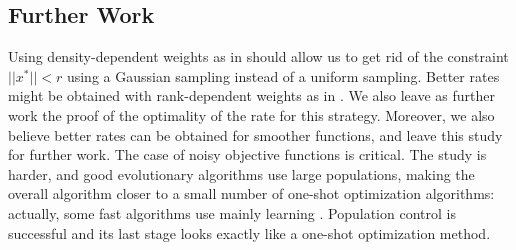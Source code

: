 \subsection*{Further Work}
Using density-dependent weights as in \cite{sumo} should allow us to get rid of the constraint $||x^*||<r$ using a Gaussian sampling instead of a uniform sampling. Better rates might be obtained with rank-dependent weights as in \cite{arnoldweights}. We also leave as further work the proof of the optimality of the rate for this strategy. Moreover, we also believe better rates can be obtained for smoother functions, and leave this study for further work.
{The case of noisy objective functions \cite{arnoldbeyer} is critical. The study is harder, and good evolutionary algorithms use large populations, making the overall algorithm closer to a small number of one-shot optimization algorithms: actually, some fast algorithms use mainly learning \cite{astete,clop,noisymesh}. Population control\cite{beyerhellwignoise} is successful and its last stage looks exactly like a one-shot optimization method.}